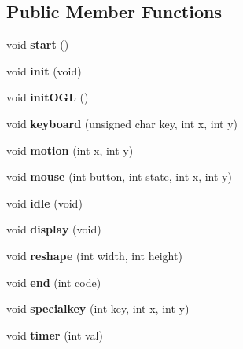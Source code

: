 \subsection*{Public Member Functions}
\begin{DoxyCompactItemize}
\item 
void {\bfseries start} ()\label{classsfs__visualizer_1_1RenderEngine_ad64b2eeeaa4aa3bccf825a1d9d00ba86}

\item 
void {\bfseries init} (void)\label{classsfs__visualizer_1_1RenderEngine_a000b228aabf54650392bf2daf9bed0ca}

\item 
void {\bfseries init\-O\-G\-L} ()\label{classsfs__visualizer_1_1RenderEngine_a9e30c9dbd1dbcd52a3192713cb18996a}

\item 
void {\bfseries keyboard} (unsigned char key, int x, int y)\label{classsfs__visualizer_1_1RenderEngine_a12449b504614e6242dac7d1d7bed2c88}

\item 
void {\bfseries motion} (int x, int y)\label{classsfs__visualizer_1_1RenderEngine_a1ddc8839474416f20803c8ef78431986}

\item 
void {\bfseries mouse} (int button, int state, int x, int y)\label{classsfs__visualizer_1_1RenderEngine_afb8308be0bbb12117e053034282f7778}

\item 
void {\bfseries idle} (void)\label{classsfs__visualizer_1_1RenderEngine_aa44da03ff2d1ed4c273a862b19899744}

\item 
void {\bfseries display} (void)\label{classsfs__visualizer_1_1RenderEngine_ac7f71c6329b5f96565a75dfc435c5646}

\item 
void {\bfseries reshape} (int width, int height)\label{classsfs__visualizer_1_1RenderEngine_aa6730eecfe6bdee9788cee9b52445a74}

\item 
void {\bfseries end} (int code)\label{classsfs__visualizer_1_1RenderEngine_a16c1c8a6ae24a9b2f5fe38eba5a068a2}

\item 
void {\bfseries specialkey} (int key, int x, int y)\label{classsfs__visualizer_1_1RenderEngine_a21807d4b8c6c6e6c299446f849b78ba2}

\item 
void {\bfseries timer} (int val)\label{classsfs__visualizer_1_1RenderEngine_a11d5241a901440fd316627663461ad36}


\end{DoxyCompactItemize}
